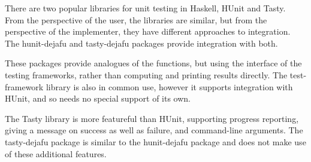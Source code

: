 There are two popular libraries for unit testing in Haskell,
HUnit\cite{hunit} and Tasty\cite{tasty}.  From the perspective of the
user, the libraries are similar, but from the perspective of the
implementer, they have different approaches to integration.  The
hunit-dejafu\cite{hunit_dejafu} and tasty-dejafu\cite{tasty_dejafu}
packages provide integration with both.

These packages provide analogues of the \dejafu{} functions, but using
the interface of the testing frameworks, rather than computing and
printing results directly.  The test-framework\cite{test_framework}
library is also in common use, however it supports integration with
HUnit, and so needs no special support of its own.

The Tasty library is more featureful than HUnit, supporting progress
reporting, giving a message on success as well as failure, and
command-line arguments.  The tasty-dejafu package is similar to the
hunit-dejafu package and does not make use of these additional
features.





